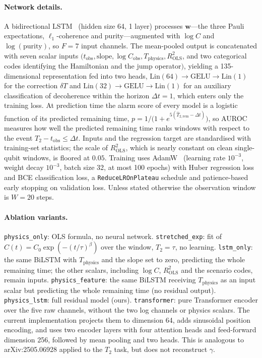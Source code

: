 \documentclass[twocolumn,10pt]{article}
\begin{document}
\paragraph{Network details.}
A bidirectional LSTM~\cite{HochreiterSchmidhuber1997} (hidden size 64,
1 layer) processes $\mathbf{w}$---the three Pauli expectations,
$\ell_1$-coherence and purity---augmented with $\log C$ and
$\log(\mathrm{purity})$, so $F = 7$ input channels.
The mean-pooled output is concatenated with seven scalar inputs
$(t_\text{obs},\text{slope},\log C_\text{obs},T_\text{physics},
R^2_\text{OLS}$, and two categorical codes identifying the Hamiltonian
and the jump operator$)$, yielding a 135-dimensional representation fed
into two heads, $\mathrm{Lin}(64)\to\mathrm{GELU}\to\mathrm{Lin}(1)$ for
the correction $\delta T$ and $\mathrm{Lin}(32)\to\mathrm{GELU}\to
\mathrm{Lin}(1)$ for an auxiliary classification of decoherence within
the horizon $\Delta t = 1$, which enters only the training loss.
At prediction time the alarm score of every model is a logistic function
of its predicted remaining time,
$p = 1/\bigl(1+e^{5(\widehat T_{2,\text{rem}}-\Delta t)}\bigr)$, so AUROC
measures how well the predicted remaining time ranks windows with
respect to the event $T_2 - t_\mathrm{obs} \le \Delta t$.
Inputs and the regression target are standardised with training-set
statistics; the scale of $R^2_\text{OLS}$, which is nearly constant on
clean single-qubit windows, is floored at $0.05$.
Training uses AdamW~\cite{LoshchilovHutter2019} (learning rate
$10^{-3}$, weight decay $10^{-3}$, batch size 32, at most 100 epochs)
with Huber regression loss and BCE classification loss, a
\texttt{ReduceLROnPlateau} schedule and patience-based early stopping on
validation loss.
Unless stated otherwise the observation window is $W = 20$ steps.

\paragraph{Ablation variants.}
\texttt{physics\_only}: OLS formula, no neural network.
\texttt{stretched\_exp}: fit of $C(t)=C_0\exp(-(t/\tau)^\beta)$ over the
window, $T_2=\tau$, no learning.
\texttt{lstm\_only}: the same BiLSTM with $T_\text{physics}$ and the slope
set to zero, predicting the whole remaining time; the other scalars, including
$\log C$, $R^2_\text{OLS}$ and the scenario codes, remain inputs.
\texttt{physics\_feature}: the same BiLSTM receiving $T_\text{physics}$ as
an input scalar but predicting the whole remaining time (no residual
output).
\texttt{physics\_lstm}: full residual model (ours).
\texttt{transformer}: pure Transformer encoder over the five raw channels,
without the two log channels or physics scalars. The current implementation
projects them to dimension 64, adds sinusoidal position encoding, and uses
two encoder layers with four attention heads and feed-forward dimension 256,
followed by mean pooling and two heads. This is analogous to
arXiv:2505.06928 applied to the $T_2$ task, but does not reconstruct $\gamma$.
\end{document}
